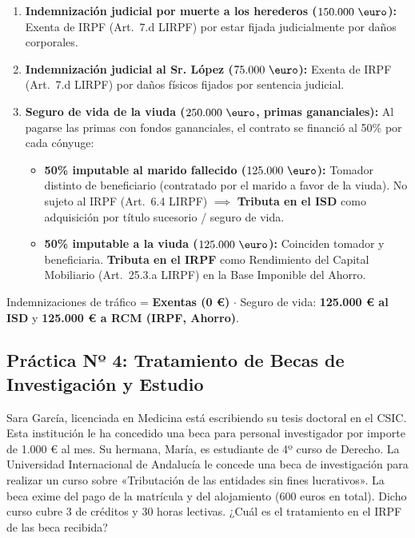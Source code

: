 \documentclass[11pt,a4paper,openany]{article}
\begin{document}
\begin{solucionBox}
\begin{enumerate}
    \item \textbf{Indemnización judicial por muerte a los herederos ($150.000\text{ \euro}$):}
    Exenta de IRPF (Art.~7.d LIRPF) por estar fijada judicialmente por daños corporales.
    
    \item \textbf{Indemnización judicial al Sr. López ($75.000\text{ \euro}$):}
    Exenta de IRPF (Art.~7.d LIRPF) por daños físicos fijados por sentencia judicial.
    
    \item \textbf{Seguro de vida de la viuda ($250.000\text{ \euro}$, primas gananciales):}
    Al pagarse las primas con fondos gananciales, el contrato se financió al 50\% por cada cónyuge:
    \begin{itemize}
        \item \textbf{50\% imputable al marido fallecido ($125.000\text{ \euro}$):} Tomador distinto de beneficiario (contratado por el marido a favor de la viuda). No sujeto al IRPF (Art.~6.4 LIRPF) $\implies$ \textbf{Tributa en el ISD} como adquisición por título sucesorio / seguro de vida.
        \item \textbf{50\% imputable a la viuda ($125.000\text{ \euro}$):} Coinciden tomador y beneficiaria. \textbf{Tributa en el IRPF} como Rendimiento del Capital Mobiliario (Art.~25.3.a LIRPF) en la Base Imponible del Ahorro.
    \end{itemize}
\end{enumerate}
\end{solucionBox}

\begin{resultadoBox}[Resultados]
Indemnizaciones de tráfico = \textbf{Exentas (0 \euro)} $\cdot$ Seguro de vida: \textbf{125.000 \euro{} al ISD} y \textbf{125.000 \euro{} a RCM (IRPF, Ahorro)}.
\end{resultadoBox}

\vspace{0.4cm}

\subsection{Práctica Nº 4: Tratamiento de Becas de Investigación y Estudio}

\begin{enunciadoBox}
Sara García, licenciada en Medicina está escribiendo su tesis doctoral en el CSIC. Esta institución le ha concedido una beca para personal investigador por importe de 1.000 \euro{} al mes. Su hermana, María, es estudiante de 4º curso de Derecho. La Universidad Internacional de Andalucía le concede una beca de investigación para realizar un curso sobre «Tributación de las entidades sin fines lucrativos». La beca exime del pago de la matrícula y del alojamiento (600 euros en total). Dicho curso cubre 3 de créditos y 30 horas lectivas. ¿Cuál es el tratamiento en el IRPF de las beca recibida?
\end{enunciadoBox}
\end{document}
